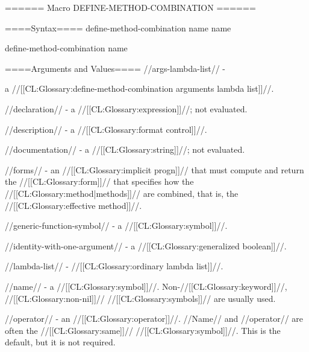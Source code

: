 ====== Macro DEFINE-METHOD-COMBINATION ======

====Syntax====
\DefmacWithValuesNewline define-method-combination {name } {name}

\DefmacWithValuesNewline define-method-combination {} {name}

  

====Arguments and Values====
//args-lambda-list// -

a //[[CL:Glossary:define-method-combination arguments lambda list]]//.

//declaration// - a  //[[CL:Glossary:expression]]//; not evaluated.

//description// - a //[[CL:Glossary:format control]]//.

//documentation// - a //[[CL:Glossary:string]]//; not evaluated.

//forms// - an //[[CL:Glossary:implicit progn]]// that must compute and return the //[[CL:Glossary:form]]// that specifies how the //[[CL:Glossary:method|methods]]// are combined, that is, the //[[CL:Glossary:effective method]]//.

//generic-function-symbol// - a //[[CL:Glossary:symbol]]//.

//identity-with-one-argument// - a //[[CL:Glossary:generalized boolean]]//.

//lambda-list// - //[[CL:Glossary:ordinary lambda list]]//.

//name// - a //[[CL:Glossary:symbol]]//. Non-//[[CL:Glossary:keyword]]//, //[[CL:Glossary:non-nil]]// //[[CL:Glossary:symbols]]// are usually used.

//operator// - an //[[CL:Glossary:operator]]//. //Name// and //operator// are often the //[[CL:Glossary:same]]// //[[CL:Glossary:symbol]]//. This is the default, but it is not required.

